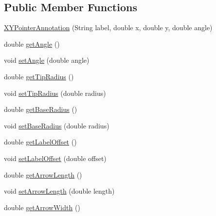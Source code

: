 \subsection*{Public Member Functions}
\begin{DoxyCompactItemize}
\item 
\mbox{\hyperlink{classorg_1_1jfree_1_1chart_1_1annotations_1_1_x_y_pointer_annotation_a9c6c9a657786b9cf53bb16056fe9796c}{X\+Y\+Pointer\+Annotation}} (String label, double x, double y, double angle)
\item 
double \mbox{\hyperlink{classorg_1_1jfree_1_1chart_1_1annotations_1_1_x_y_pointer_annotation_a341014ea8ea7ba91ffdbdb77588744c7}{get\+Angle}} ()
\item 
void \mbox{\hyperlink{classorg_1_1jfree_1_1chart_1_1annotations_1_1_x_y_pointer_annotation_aae1dfb849164ad0d6ed651dcbd195b3f}{set\+Angle}} (double angle)
\item 
double \mbox{\hyperlink{classorg_1_1jfree_1_1chart_1_1annotations_1_1_x_y_pointer_annotation_aad79a5c813eb31e69f2f7bad643ec70a}{get\+Tip\+Radius}} ()
\item 
void \mbox{\hyperlink{classorg_1_1jfree_1_1chart_1_1annotations_1_1_x_y_pointer_annotation_a35017408da6404615081e0bd00a75578}{set\+Tip\+Radius}} (double radius)
\item 
double \mbox{\hyperlink{classorg_1_1jfree_1_1chart_1_1annotations_1_1_x_y_pointer_annotation_a7dd9c99999b7faf6911d9fc400e809f9}{get\+Base\+Radius}} ()
\item 
void \mbox{\hyperlink{classorg_1_1jfree_1_1chart_1_1annotations_1_1_x_y_pointer_annotation_a18b4429ee9df0dd4cb350f32defa55b8}{set\+Base\+Radius}} (double radius)
\item 
double \mbox{\hyperlink{classorg_1_1jfree_1_1chart_1_1annotations_1_1_x_y_pointer_annotation_aaced523c72b3024fad2fcd423eaccd7c}{get\+Label\+Offset}} ()
\item 
void \mbox{\hyperlink{classorg_1_1jfree_1_1chart_1_1annotations_1_1_x_y_pointer_annotation_a61ee30840b0737c260e55b00082e207c}{set\+Label\+Offset}} (double offset)
\item 
double \mbox{\hyperlink{classorg_1_1jfree_1_1chart_1_1annotations_1_1_x_y_pointer_annotation_acd4f8668892f3f126915d73efd70135b}{get\+Arrow\+Length}} ()
\item 
void \mbox{\hyperlink{classorg_1_1jfree_1_1chart_1_1annotations_1_1_x_y_pointer_annotation_ab54bd7dea136f2cdeeece616bc0b51d3}{set\+Arrow\+Length}} (double length)
\item 
double \mbox{\hyperlink{classorg_1_1jfree_1_1chart_1_1annotations_1_1_x_y_pointer_annotation_a77602bfbf1eaac644b2832138d33cfd8}{get\+Arrow\+Width}} ()

\end{DoxyCompactItemize}
